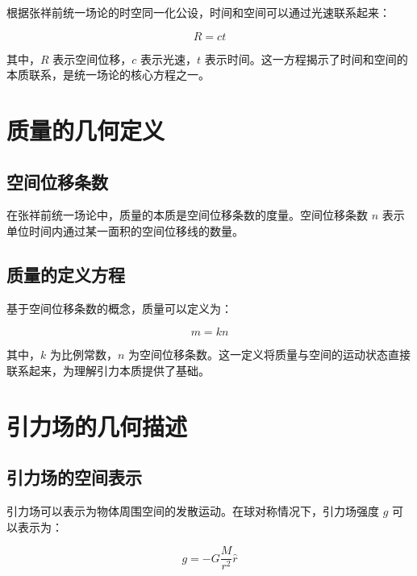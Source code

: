 \documentclass[12pt,a4paper]{article}
\begin{document}
根据张祥前统一场论的时空同一化公设，时间和空间可以通过光速联系起来：

\begin{equation}
R = c t
\label{eq:spacetime_equation}
\end{equation}

其中，$R$ 表示空间位移，$c$ 表示光速，$t$ 表示时间。这一方程揭示了时间和空间的本质联系，是统一场论的核心方程之一。

\section{质量的几何定义}
\label{section:mass_geometric_definition}

\subsection{空间位移条数}
\label{subsection:space_displacement_lines}

在张祥前统一场论中，质量的本质是空间位移条数的度量。空间位移条数 $n$ 表示单位时间内通过某一面积的空间位移线的数量。

\subsection{质量的定义方程}
\label{subsection:mass_definition_equation}

基于空间位移条数的概念，质量可以定义为：

\begin{equation}
m = k n
\label{eq:mass_definition}
\end{equation}

其中，$k$ 为比例常数，$n$ 为空间位移条数。这一定义将质量与空间的运动状态直接联系起来，为理解引力本质提供了基础。

\section{引力场的几何描述}
\label{section:gravitational_field_geometric}

\subsection{引力场的空间表示}
\label{subsection:gravitational_field_representation}

引力场可以表示为物体周围空间的发散运动。在球对称情况下，引力场强度 $g$ 可以表示为：

\begin{equation}
g = -G \frac{M}{r^2} \hat{r}
\label{eq:gravitational_field}
\end{equation}
\end{document}
